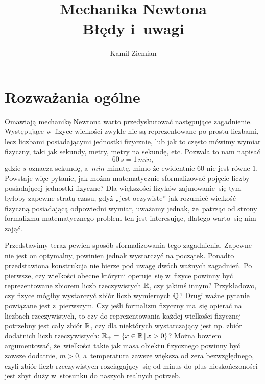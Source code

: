 \documentclass[a4paper,11pt]{article}
\title{Mechanika Newtona \\
  {\Large Błędy i~uwagi}}
\author{Kamil Ziemian}
\begin{document}





\maketitle %





\section{Rozważania ogólne}

\vspace{\spaceTwo}



Omawiają mechanikę Newtona warto przedyskutować następujące zagadnienie.
Występujące w~fizyce wielkości zwykle nie są reprezentowane po prostu
liczbami, lecz liczbami posiadającymi jednostki fizycznie, lub jak to
często mówimy wymiar fizyczny, taki jak sekundy, metry, metry na sekundę,
etc. Pozwala to nam napisać
\begin{equation}
  \label{eq:Mechanika-Rozwazania-ogolne-01}
  60 \, \si{s} = 1 \, \si{min},
\end{equation}
gdzie $\si{s}$ oznacza sekundę, a~$\si{min}$ minutę, mimo że ewidentnie
$60$ nie jest równe $1$. Powstaje więc pytanie, jak można matematycznie
sformalizować pojęcie liczby posiadającej jednostki fizyczne? Dla większości
fizyków zajmowanie~się tym byłoby zapewne stratą czasu, gdyż „jest
oczywiste” jak rozumieć wielkość fizyczną posiadającą odpowiedni wymiar,
uważamy jednak, że~patrząc od strony formalizmu matematycznego problem
ten jest interesując, dlatego warto~się nim zająć.

Przedstawimy teraz pewien sposób sformalizowania tego zagadnienia. Zapewne
nie jest on optymalny, powinien jednak wystarczyć na początek. Ponadto
przedstawiona konstrukcja nie bierze pod uwagę dwóch ważnych zagadnień. Po
pierwsze, czy wielkości obecne którymi operuje~się w~fizyce powinny być
reprezentowane zbiorem liczb rzeczywistych $\mathbb{R}$, czy jakimś innym?
Przykładowo, czy fizyce mógłby wystarczyć zbiór liczb wymiernych $\mathbb{Q}$?
Drugi ważne pytanie powiązane jest z~pierwszym. Czy jeśli formalizm fizyczny
ma~się opierać na liczbach rzeczywistych, to czy do reprezentowania każdej
wielkości fizycznej potrzebny jest cały zbiór $\mathbb{R}$, czy dla niektórych
wystarczający jest np. zbiór dodatnich liczb rzeczywistych:
$\mathbb{R}_{ + } = \{ x \in \mathbb{R} \, | \, x > 0 \}$? Można bowiem argumentować,
że~wielkości takie jak masa obiektu fizycznego powinny być zawsze dodatnie,
$m > 0$, a~temperatura zawsze większa od zera bezwzględnego, czyli zbiór
liczb rzeczywistych rozciągający~się od minus do plus nieskończoności jest
zbyt duży w~stosunku do naszych realnych potrzeb.
\end{document}
